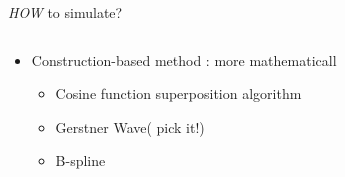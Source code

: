 \documentclass[handout,t]{beamer}
\begin{document}
\begin{frame}[t]{\emph{HOW} to simulate?}
\begin{columns}
\begin{column}{.48\textwidth}
\begin{itemize}
          \begin{itemize}
            [ball]  
            \item Blinn, 1978, Bump Mapping
          \end{itemize}
        \item Construction-based method : more mathematicall
          \begin{itemize}
            [ball]  
            \item Cosine function superposition algorithm
            \item Gerstner Wave(\color{red} pick it!\checkmark)
            \item B-spline
          \end{itemize}
      \end{itemize}
    \end{column}%
  \end{columns}
\end{frame}
\end{document}
